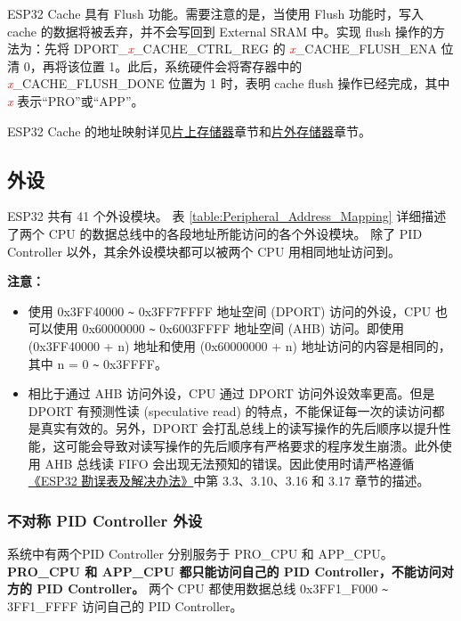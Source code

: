 \documentclass[main\_\_CN.tex]{subfiles}
\begin{document}
ESP32 Cache 具有 Flush 功能。需要注意的是，当使用 Flush 功能时，写入 cache 的数据将被丢弃，并不会写回到 External SRAM 中。实现 flush 操作的方法为：先将 DPORT\_\textcolor{red}{\it{x}}\_CACHE\_CTRL\_REG 的 \textcolor{red}{\it{x}}\_CACHE\_FLUSH\_ENA 位清 0，再将该位置 1。此后，系统硬件会将寄存器中的 \textcolor{red}{\it{x}}\_CACHE\_FLUSH\_DONE 位置为 1 时，表明 cache flush 操作已经完成，其中 \textcolor{red}{\it{x}} 表示“PRO”或“APP”。

ESP32 Cache 的地址映射详见\hyperref[para:embedded memory]{片上存储器}章节和\hyperref[para:external_Memory]{片外存储器}章节。

\subsection{外设}

ESP32 共有 41 个外设模块。
表 \ref{table:Peripheral_Address_Mapping} 详细描述了两个 CPU 的数据总线中的各段地址所能访问的各个外设模块。
除了 PID Controller 以外，其余外设模块都可以被两个 CPU 用相同地址访问到。


{\bfseries 注意：}
\begin{itemize}
    \item 使用 0x3FF40000 \verb+~+ 0x3FF7FFFF 地址空间 (DPORT) 访问的外设，CPU 也可以使用 0x60000000 \verb+~+ 0x6003FFFF 地址空间 (AHB) 访问。即使用 (0x3FF40000 + n) 地址和使用 (0x60000000 + n) 地址访问的内容是相同的，其中 n = 0 \verb+~+ 0x3FFFF。
    \item 相比于通过 AHB 访问外设，CPU 通过 DPORT 访问外设效率更高。但是 DPORT 有预测性读 (speculative read) 的特点，不能保证每一次的读访问都是真实有效的。另外，DPORT 会打乱总线上的读写操作的先后顺序以提升性能，这可能会导致对读写操作的先后顺序有严格要求的程序发生崩溃。此外使用 AHB 总线读 FIFO 会出现无法预知的错误。因此使用时请严格遵循 \href{https://www.espressif.com/sites/default/files/documentation/eco_and_workarounds_for_bugs_in_esp32_cn.pdf}{《ESP32 勘误表及解决办法》}中第 3.3、3.10、3.16 和 3.17 章节的描述。
\end{itemize}

\subsubsection{不对称 PID Controller 外设}

\hypertarget{CPU_Use_PID_Controller}{}

系统中有两个PID Controller 分别服务于 PRO\_CPU 和 APP\_CPU。
\textbf{PRO\_CPU 和 APP\_CPU 都只能访问自己的 PID Controller，不能访问对方的 PID Controller。}
两个 CPU 都使用数据总线 0x3FF1\_F000 \verb+~+ 3FF1\_FFFF 访问自己的 PID Controller。
\end{document}
